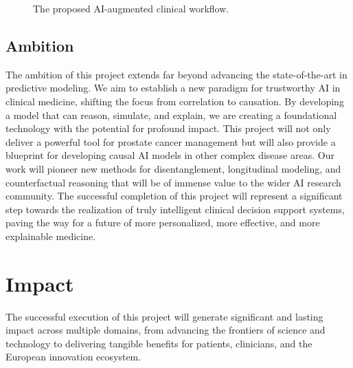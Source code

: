 \documentclass[11pt, a4paper]{article}
\begin{document}
\begin{figure}[H]
    \centering
    \caption{The proposed AI-augmented clinical workflow.}
    \label{fig:workflow}
\end{figure}

\subsection{Ambition}
The ambition of this project extends far beyond advancing the state-of-the-art in predictive modeling. We aim to establish a new paradigm for trustworthy AI in clinical medicine, shifting the focus from correlation to causation. By developing a model that can reason, simulate, and explain, we are creating a foundational technology with the potential for profound impact. This project will not only deliver a powerful tool for prostate cancer management but will also provide a blueprint for developing causal AI models in other complex disease areas. Our work will pioneer new methods for disentanglement, longitudinal modeling, and counterfactual reasoning that will be of immense value to the wider AI research community. The successful completion of this project will represent a significant step towards the realization of truly intelligent clinical decision support systems, paving the way for a future of more personalized, more effective, and more explainable medicine.

\section{Impact}
The successful execution of this project will generate significant and lasting impact across multiple domains, from advancing the frontiers of science and technology to delivering tangible benefits for patients, clinicians, and the European innovation ecosystem.
\end{document}
